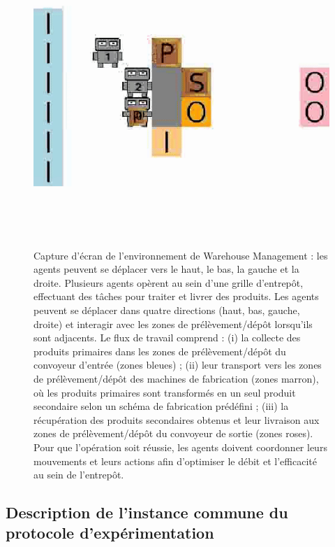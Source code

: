 \begin{figure}[h!]
  \centering
  \includegraphics[trim=0cm 3cm 0cm 3cm, clip, width=0.9\linewidth]{figures/wm.png}
  \caption[Capture d'écran de l'environnement de Warehouse Management]{Capture d'écran de l'environnement de Warehouse Management : les agents peuvent se déplacer vers le haut, le bas, la gauche et la droite. Plusieurs agents opèrent au sein d'une grille d'entrepôt, effectuant des tâches pour traiter et livrer des produits. Les agents peuvent se déplacer dans quatre directions (haut, bas, gauche, droite) et interagir avec les zones de prélèvement/dépôt lorsqu'ils sont adjacents. Le flux de travail comprend : (i) la collecte des produits primaires dans les zones de prélèvement/dépôt du convoyeur d'entrée (zones bleues) ; (ii) leur transport vers les zones de prélèvement/dépôt des machines de fabrication (zones marron), où les produits primaires sont transformés en un seul produit secondaire selon un schéma de fabrication prédéfini ; (iii) la récupération des produits secondaires obtenus et leur livraison aux zones de prélèvement/dépôt du convoyeur de sortie (zones roses). Pour que l'opération soit réussie, les agents doivent coordonner leurs mouvements et leurs actions afin d'optimiser le débit et l'efficacité au sein de l'entrepôt.}
  \label{fig:warehouse}
\end{figure}


\subsection{Description de l'instance commune du protocole d'expérimentation}

